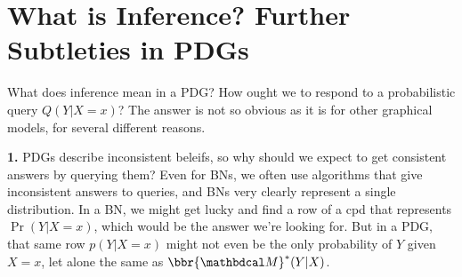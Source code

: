 

\section{What is Inference?  Further Subtleties in PDGs}

What does inference mean in a PDG?
How ought we to respond to a probabilistic query $Q(Y|X{=}x)$?
The answer is not so obvious as it is for other graphical models,
for several different reasons.

\textbf{1.}
PDGs describe inconsistent beleifs,
so why should we expect to get consistent answers by querying them?
Even for BNs, we often use algorithms that give inconsistent answers to queries, and BNs very clearly represent a single distribution.
%
In a BN, we might get lucky and find a row of a cpd that represents $\Pr(Y|X{=}x)$, which would be the answer we're looking for.
But in a PDG, that same row  $p(Y | X{=}x)$ might not even be the only probability of $Y$ given $X{=}x$, let alone the same as $\bbr{\dg M}^*(Y|X)$.

